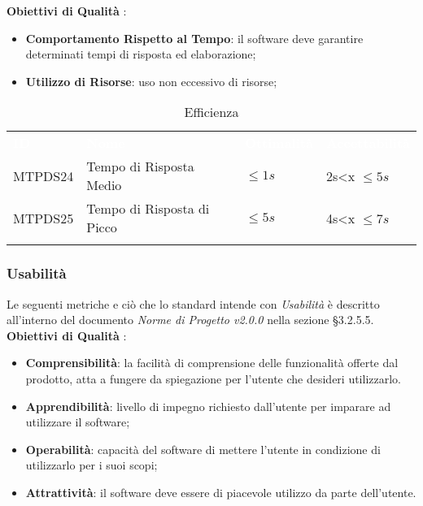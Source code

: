 \textbf{Obiettivi di Qualità} :

\begin{itemize}
	\item \textbf{Comportamento Rispetto al Tempo}: il software deve garantire determinati tempi di risposta ed elaborazione;
	\item \textbf{Utilizzo di Risorse}: uso non eccessivo di risorse;
\end{itemize}

\begin{longtable}{|C{.15\textwidth}|C{.24\textwidth}|C{.24\textwidth}|C{.24\textwidth}|}
\hline
{}\textbf{\textcolor{white}{ID}} & \textbf{\textcolor{white}{Nome}} & \textbf{\textcolor{white}{Ottimalità}} & \textbf{\textcolor{white}{Accettabilità}}\\
MTPDS24 & Tempo di Risposta Medio & $\leq 1s$ & 2s<x $\leq 5s$\\
\hline
{}MTPDS25 & Tempo di Risposta di Picco  & $\leq 5s$ & 4s<x $\leq 7s$ \\ 
\hline
\caption{Efficienza}
\label{Efficienza}
\end{longtable}



\subsubsection{Usabilità}

Le seguenti metriche e ciò che lo standard intende con \textit{Usabilità} è descritto all'interno del documento \textit{Norme di Progetto v2.0.0} nella sezione §3.2.5.5. \\

\textbf{Obiettivi di Qualità} :

\begin{itemize}
	\item \textbf{Comprensibilità}: la facilità di comprensione delle funzionalità offerte dal prodotto, atta a fungere da spiegazione per l'utente che desideri utilizzarlo. 
	\item \textbf{Apprendibilità}: livello di impegno richiesto dall'utente per imparare ad utilizzare il software;
	\item \textbf{Operabilità}: capacità del software di mettere l'utente in condizione di utilizzarlo per i suoi scopi; 
	\item \textbf{Attrattività}: il software deve essere di piacevole utilizzo da parte dell'utente.
\end{itemize}

